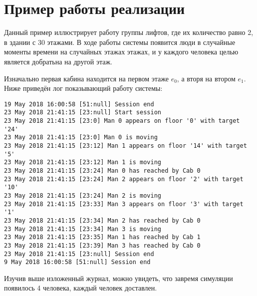 \section{ Пример работы реализации}

	Данный пример иллюстрирует работу группы лифтов, где их количество равно 2, в здании с 30 этажами.
		В ходе работы системы появится люди в случайные моменты времени на случайных этажах этажах,
		и у каждого человека целью является добратьна на другой этаж.

	Изначально первая кабина находится на первом этаже $e_0$, а вторя на втором $e_1$.
		Ниже приведён лог показывающий работу системы:
\begin{lstlisting}[basicstyle=\footnotesize]
19 May 2018 16:00:58 [51:null] Session end
23 May 2018 21:41:15 [23:null] Start session
23 May 2018 21:41:15 [23:0] Man 0 appears on floor '0' with target '24'
23 May 2018 21:41:15 [23:0] Man 0 is moving
23 May 2018 21:41:15 [23:12] Man 1 appears on floor '14' with target '5'
23 May 2018 21:41:15 [23:12] Man 1 is moving
23 May 2018 21:41:15 [23:24] Man 0 has reached by Cab 0
23 May 2018 21:41:15 [23:24] Man 2 appears on floor '2' with target '10'
23 May 2018 21:41:15 [23:24] Man 2 is moving
23 May 2018 21:41:15 [23:33] Man 3 appears on floor '3' with target '1'
23 May 2018 21:41:15 [23:34] Man 2 has reached by Cab 0
23 May 2018 21:41:15 [23:34] Man 3 is moving
23 May 2018 21:41:15 [23:35] Man 1 has reached by Cab 1
23 May 2018 21:41:15 [23:39] Man 3 has reached by Cab 0
23 May 2018 21:41:15 [23:null] Session end
9 May 2018 16:00:58 [51:null] Session end
\end{lstlisting}

	Изучив выше изложенный журнал, можно увидеть, что завремя симуляции появилось 4 человека,
		каждый человек доставлен.
